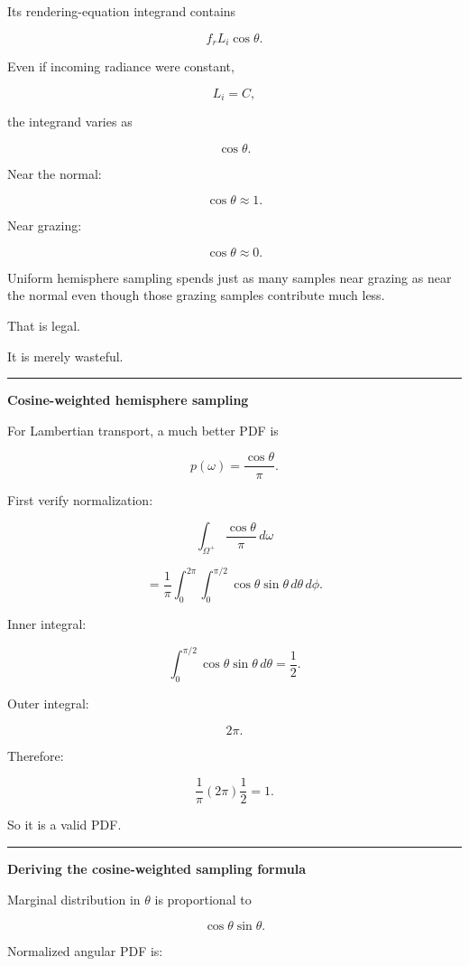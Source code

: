 Its rendering-equation integrand contains

\[
f_rL_i\cos\theta.
\]

Even if incoming radiance were constant,

\[
L_i=C,
\]

the integrand varies as

\[
\cos\theta.
\]

Near the normal:

\[
\cos\theta\approx1.
\]

Near grazing:

\[
\cos\theta\approx0.
\]

Uniform hemisphere sampling spends just as many samples near grazing as near the normal even though those grazing samples contribute much less.

That is legal.

It is merely wasteful.

\begin{center}\rule{0.5\linewidth}{0.5pt}\end{center}

\textbf{Cosine-weighted hemisphere sampling}

For Lambertian transport, a much better PDF is

\[
\boxed{
p(\omega)
=
\frac{\cos\theta}{\pi}.
}
\]

First verify normalization:

\[
\int_{\Omega^+}
\frac{\cos\theta}{\pi}
\,d\omega
\]

\[
=
\frac1\pi
\int_0^{2\pi}
\int_0^{\pi/2}
\cos\theta
\sin\theta
\,d\theta\,d\phi.
\]

Inner integral:

\[
\int_0^{\pi/2}
\cos\theta\sin\theta\,d\theta
=
\frac12.
\]

Outer integral:

\[
2\pi.
\]

Therefore:

\[
\frac1\pi
(2\pi)
\frac12
=
1.
\]

So it is a valid PDF.

\begin{center}\rule{0.5\linewidth}{0.5pt}\end{center}

\textbf{Deriving the cosine-weighted sampling formula}

Marginal distribution in \(\theta\) is proportional to

\[
\cos\theta\sin\theta.
\]

Normalized angular PDF is:

